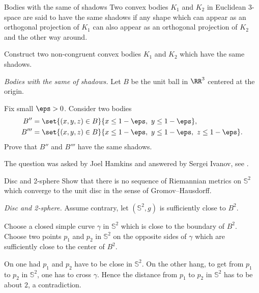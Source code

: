 \begin{pr}{\easy}{Bodies with the same of shadows}\label{Bodies with the same of shadows}
Two convex bodies $K_1$ and $K_2$ in Euclidean 3-space are said to have the same shadows if any shape which can appear as an orthogonal projection of $K_1$ can also appear as an orthogonal projection of $K_2$ and the other way around.

Construct two non-congruent convex bodies $K_1$ and $K_2$ which have the same shadows.
\end{pr}

\textit{Bodies with the same of shadows.}
Let $B$ be the unit ball in $\RR^3$ centered at the origin.

Fix small $\eps>0$.
Consider two bodies 
\begin{align*}
B''&=\set{(x,y,z)\in B}{x\le 1-\eps,\  y\le 1-\eps},
\\ 
B'''&=\set{(x,y,z)\in B}{x\le 1-\eps,\  y\le 1-\eps,\  z\le 1-\eps}.
\end{align*}
Prove that $B''$ and $B'''$ have the same shadows.

 The question was asked by Joel Hamkins and answered by Sergei Ivanov, see \cite{hamkins}.









\begin{pr}{}{Disc and 2-sphere}\label{2-sphere is far from a ball}
Show that there is no sequence of Riemannian metrics on
$\mathbb{S}^2$ which converge to the unit disc in the sense of Gromov--Hausdorff.
\end{pr}
\textit{Disc and 2-sphere.}
Assume contrary, let $(\mathbb{S}^2,g)$ is sufficiently close to $B^2$.

Choose a closed simple curve $\gamma$ in $\mathbb{S}^2$ which is close to the boundary of $B^2$.
Choose two points $p_1$ and $p_2$ in $\mathbb{S}^2$ 
on the opposite sides of $\gamma$ which are sufficiently close to the center of $B^2$.

On one had $p_1$ and $p_2$ have to be close in $\mathbb{S}^2$.
On the other hang, to get from $p_1$ to $p_2$ in $\mathbb{S}^2$,
one has to cross $\gamma$.
Hence the distance from $p_1$ to $p_2$ in $\mathbb{S}^2$ has to be about $2$,
a contradiction.


